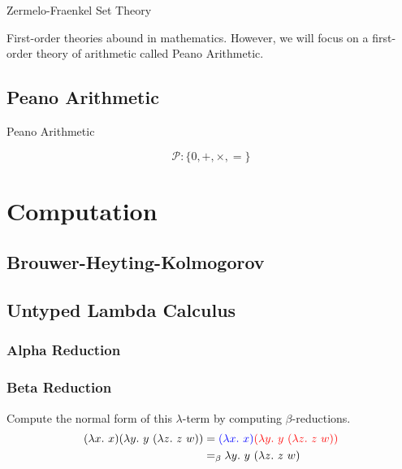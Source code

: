 \documentclass{book}
\begin{document}
    \begin{eg}{Zermelo-Fraenkel Set Theory}


    \end{eg}

    First-order theories abound in mathematics. However, we will focus on a first-order theory of arithmetic called Peano Arithmetic. 

    \newpage
    \section{Peano Arithmetic}

    \begin{definition}{Peano Arithmetic}

        $$\mathcal{P} : \{0, +, \times, =\}$$

    \end{definition}


\chapter{Computation}

    \newpage
    \section{Brouwer-Heyting-Kolmogorov}

    \newpage
    \section{Untyped Lambda Calculus}

    \subsection*{Alpha Reduction}

    \subsection*{Beta Reduction}


    \begin{eg}{}
        Compute the normal form of this $\lambda$-term by computing $\beta$-reductions. 
        \begin{align*}
            (\lambda x. \ x)(\lambda y. \ y \ (\lambda z. \ z \ w)) &= \textcolor{blue}{(\lambda x. \ x)} \textcolor{red}{(\lambda y. \ y \ (\lambda z. \ z \ w))} \\
            &=_{\beta} \lambda y. \ y \ (\lambda z. \ z \ w)
        \end{align*}
    \end{eg}
    
\end{document}

